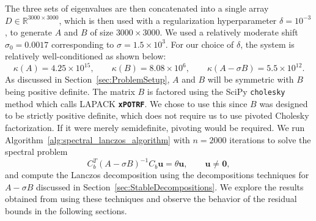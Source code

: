 The three sets of eigenvalues are then concatenated into a single array $D \in \mathbb{R}^{3000 \times 3000}$, which is then used with a regularization hyperparameter $\delta = 10^{-3}$, to generate $A$ and $B$ of size $3000 \times 3000$. We used a relatively moderate shift $\sigma_0 = 0.0017$ corresponding to $\sigma=1.5 \times 10^3$. For our choice of $\delta$, the system is relatively well-conditioned as shown below:
\begin{equation*}
	\kappa(A) = 4.25 \times 10^{15}, \qquad \kappa(B) = 8.08 \times 10^6, \qquad \kappa(A-\sigma B) = 5.5 \times 10^{12}.
\end{equation*}
As discussed in Section~\ref{sec:ProblemSetup}, $A$ and $B$ will be symmetric with $B$ being positive definite. The matrix $B$ is factored using the SciPy \texttt{cholesky} method which calls LAPACK \textbf{\texttt{xPOTRF}}. We chose to use this since $B$ was designed to be strictly positive definite, which does not require us to use pivoted Cholesky factorization. If it were merely semidefinite, pivoting would be required. We run Algorithm~\ref{alg:spectral_lanczos_algorithm} with $n=2000$ iterations to solve the spectral problem
\begin{equation}\label{eq:ShiftedInvertedProblem2}
	C_b^T (A-\sigma B)^{-1} C_b \mathbf{u} = \theta \mathbf{u}, \qquad \mathbf{u} \neq \mathbf{0},
\end{equation}
and compute the Lanczos decomposition using the decompositions techniques for $A - \sigma B$ discussed in Section~\ref{sec:StableDecompositions}. We explore the results obtained from using these techniques and observe the behavior of the residual bounds in the following sections.

